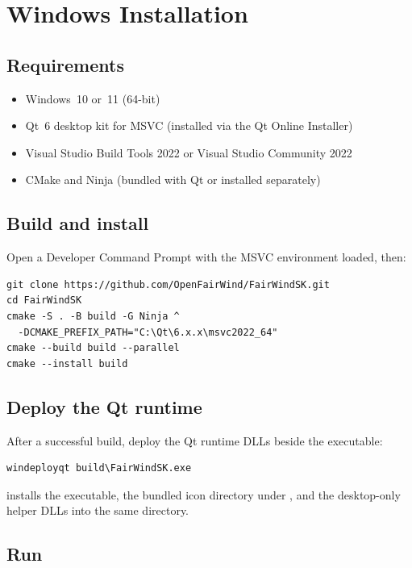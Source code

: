 \section{Windows Installation}
\label{app:windows}

\subsection{Requirements}

\begin{itemize}
  \item Windows~10 or~11 (64-bit)
  \item Qt~6 desktop kit for MSVC
        (installed via the Qt Online Installer)
  \item Visual Studio Build Tools 2022 or Visual Studio Community 2022
  \item CMake and Ninja
        (bundled with Qt or installed separately)
\end{itemize}

\subsection{Build and install}

Open a Developer Command Prompt with the MSVC environment loaded,
then:

\begin{lstlisting}
git clone https://github.com/OpenFairWind/FairWindSK.git
cd FairWindSK
cmake -S . -B build -G Ninja ^
  -DCMAKE_PREFIX_PATH="C:\Qt\6.x.x\msvc2022_64"
cmake --build build --parallel
cmake --install build
\end{lstlisting}

\subsection{Deploy the Qt runtime}

After a successful build, deploy the Qt runtime DLLs beside the
executable:

\begin{lstlisting}
windeployqt build\FairWindSK.exe
\end{lstlisting}

 installs the executable, the bundled icon
directory under , and the desktop-only
helper DLLs into the same  directory.

\subsection{Run}

